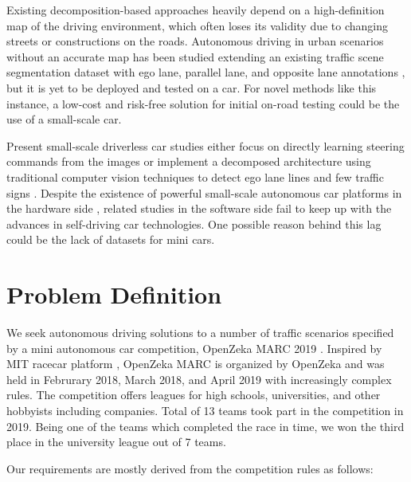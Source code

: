 Existing decomposition-based approaches heavily depend on a high-definition map
of the driving environment, which often loses its validity due to changing
streets or constructions on the roads. Autonomous driving in urban scenarios
without an accurate map has been studied extending an existing traffic scene
segmentation dataset with ego lane, parallel lane, and opposite lane
annotations \cite{Meyer2018DeepSL}, but it is yet to be deployed and tested on
a car. For novel methods like this instance, a low-cost and risk-free solution
for initial on-road testing could be the use of a small-scale car.

Present small-scale driverless car studies either focus on directly learning
steering commands from the images \cite{Bechtel2017DeepPicarAL,
Do2018RealTimeSC} or implement a decomposed architecture using traditional
computer vision techniques to detect ego lane lines and few traffic signs
\cite{Blaga2018MiniatureAV}. Despite the existence of powerful small-scale
autonomous car platforms in the hardware side \cite{Karaman2017ProjectbasedCA},
related studies in the software side fail to keep up with the advances in
self-driving car technologies. One possible reason behind this lag could be the
lack of datasets for mini cars.


\section{Problem Definition}

We seek autonomous driving solutions to a number of traffic scenarios specified
by a mini autonomous car competition, OpenZeka MARC 2019 \cite{OpenZekaMARC}.
Inspired by MIT racecar platform \cite{Karaman2017ProjectbasedCA}, OpenZeka
MARC is organized by OpenZeka and was held in Februrary 2018, March 2018, and
April 2019 with increasingly complex rules. The competition offers leagues for
high schools, universities, and other hobbyists including companies. Total of
13 teams took part in the competition in 2019. Being one of the teams which
completed the race in time, we won the third place in the university league out
of 7 teams.

Our requirements are mostly derived from the competition rules as follows:

